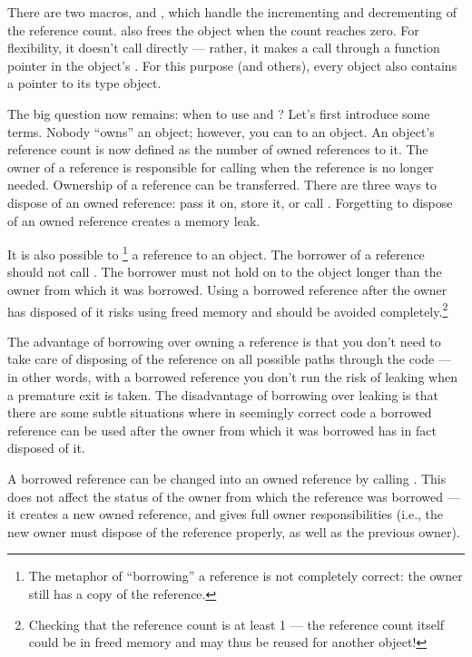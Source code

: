 \documentclass{manual}
\begin{document}
There are two macros,  and ,
which handle the incrementing and decrementing of the reference count.
 also frees the object when the count reaches zero.
For flexibility, it doesn't call  directly --- rather, it
makes a call through a function pointer in the object's .  For this purpose (and others), every object also contains a
pointer to its type object.

The big question now remains: when to use  and
?  Let's first introduce some terms.  Nobody
``owns'' an object; however, you can  to an
object.  An object's reference count is now defined as the number of
owned references to it.  The owner of a reference is responsible for
calling  when the reference is no longer
needed.  Ownership of a reference can be transferred.  There are three
ways to dispose of an owned reference: pass it on, store it, or call
.  Forgetting to dispose of an owned reference
creates a memory leak.

It is also possible to \footnote{The metaphor of
``borrowing'' a reference is not completely correct: the owner still
has a copy of the reference.} a reference to an object.  The borrower
of a reference should not call .  The borrower must
not hold on to the object longer than the owner from which it was
borrowed.  Using a borrowed reference after the owner has disposed of
it risks using freed memory and should be avoided
completely.\footnote{Checking that the reference count is at least 1
 --- the reference count itself could be in
freed memory and may thus be reused for another object!}

The advantage of borrowing over owning a reference is that you don't
need to take care of disposing of the reference on all possible paths
through the code --- in other words, with a borrowed reference you
don't run the risk of leaking when a premature exit is taken.  The
disadvantage of borrowing over leaking is that there are some subtle
situations where in seemingly correct code a borrowed reference can be
used after the owner from which it was borrowed has in fact disposed
of it.

A borrowed reference can be changed into an owned reference by calling
.  This does not affect the status of the owner from
which the reference was borrowed --- it creates a new owned reference,
and gives full owner responsibilities (i.e., the new owner must
dispose of the reference properly, as well as the previous owner).
\end{document}
